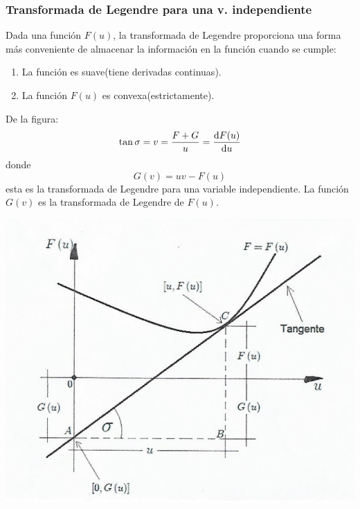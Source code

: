 \documentclass[../main]{subfiles}
\begin{document}
\subsubsection{Transformada de Legendre para una v. independiente}
Dada una función $F(u)$, la transformada de Legendre proporciona una forma más conveniente de almacenar la información en la función cuando se cumple:
\begin{enumerate}
    \item La función es suave(tiene derivadas continuas).
    \item La función $F(u)$ es convexa(estrictamente).
\end{enumerate}
\begin{minipage}{0.5\textwidth}
    De la figura:
    \begin{equation}
        \tan \sigma=v=\dfrac{F+G}{u}=\dv{F(u)}{u}
    \end{equation}
    donde 
    \begin{equation}
        G(v)=uv-F(u)
    \end{equation}
    esta es la transformada de Legendre para una variable independiente. La función $G(v)$ es la transformada de Legendre de $F(u)$.
\end{minipage}
\begin{minipage}{0.5\textwidth}
    \begin{center}
        \includegraphics[scale=0.45]{figs/legendre1.PNG}
    \end{center}
\end{minipage}
\end{document}
